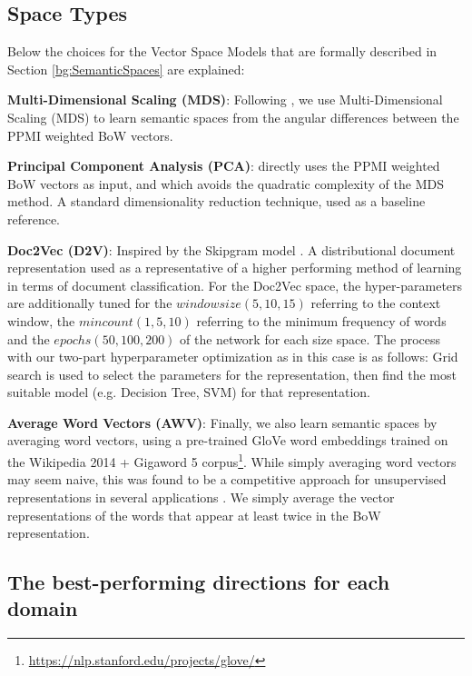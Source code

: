 \subsection{Space Types}

Below the choices for the Vector Space Models that are formally described in Section \ref{bg:SemanticSpaces} are explained:

\textbf{Multi-Dimensional Scaling (MDS)}: Following \cite{derracAIJ}, we use Multi-Dimensional Scaling (MDS) to learn semantic spaces from the angular differences between the PPMI weighted BoW vectors. %

\textbf{Principal Component Analysis (PCA)}: directly uses the PPMI weighted BoW vectors as input, and which avoids the quadratic complexity of the MDS method. A standard dimensionality reduction technique, used as a baseline reference.

\textbf{Doc2Vec (D2V)}: Inspired by the Skipgram model \cite{DBLP:conf/icml/LeM14}.  A distributional document representation used as a representative of a higher performing method of learning in terms of document classification. For the Doc2Vec space, the hyper-parameters are additionally tuned for the $window size (5, 10, 15)$ referring to the context window, the $min count (1, 5, 10)$ referring to the minimum frequency of words and the $epochs (50, 100, 200)$ of the network for each size space. The process with our two-part hyperparameter optimization as in this case is as follows: Grid search is used to select the parameters for the representation, then find the most suitable model (e.g. Decision Tree, SVM) for that representation. 

\textbf{Average Word Vectors (AWV)}: Finally, we also learn semantic spaces by averaging word vectors, using a pre-trained GloVe word embeddings trained on the Wikipedia 2014 + Gigaword 5 corpus\footnote{\url{https://nlp.stanford.edu/projects/glove/}}. While simply averaging word vectors may seem naive, this was found to be a competitive approach for unsupervised representations in several applications \cite{DBLP:conf/naacl/HillCK16}. We simply average the vector representations of the words that appear at least twice in the BoW representation.


\subsection{The best-performing directions for each domain}


